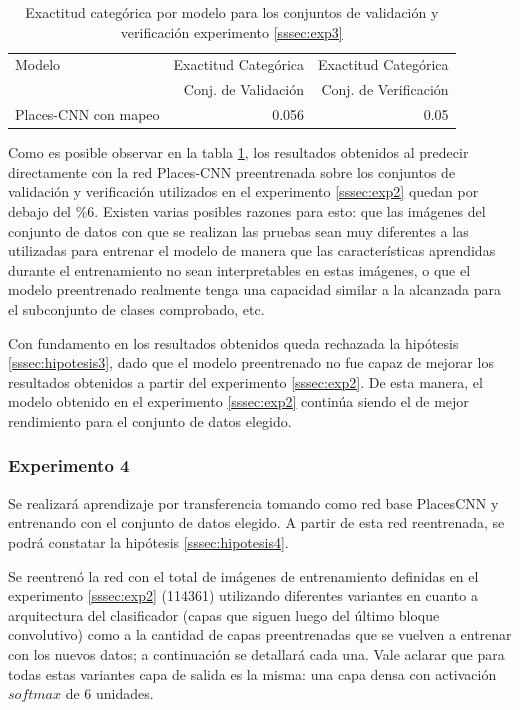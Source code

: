 \begin{table}[h!]
	\centering
	\begin{tabular}{| l | r | r |}
		\toprule
		Modelo & Exactitud Categórica &  Exactitud Categórica \\
		{} & Conj. de Validación &  Conj. de Verificación \\
		\midrule
		Places-CNN con mapeo & 0.056 & 0.05 \\
		\bottomrule
	\end{tabular}
	\caption{Exactitud categórica por modelo para los conjuntos de validación y verificación experimento \ref{sssec:exp3}}
	\label{exp3:results}
\end{table}

Como es posible observar en la tabla \ref{exp3:results}, los resultados obtenidos al predecir directamente con la red Places-CNN preentrenada sobre los conjuntos de validación y verificación utilizados en el experimento \ref{sssec:exp2} quedan por debajo del \%6. Existen varias posibles razones para esto: que las imágenes del conjunto de datos con que se realizan las pruebas sean muy diferentes a las utilizadas para entrenar el modelo de manera que las características aprendidas durante el entrenamiento no sean interpretables en estas imágenes, o que el modelo preentrenado realmente tenga una capacidad similar a la alcanzada para el subconjunto de clases comprobado, etc.

Con fundamento en los resultados obtenidos queda rechazada la hipótesis \ref{sssec:hipotesis3}, dado que el modelo preentrenado no fue capaz de mejorar los resultados obtenidos a partir del experimento \ref{sssec:exp2}. De esta manera, el modelo obtenido en el experimento \ref{sssec:exp2} continúa siendo el de mejor rendimiento para el conjunto de datos elegido.

\subsubsection{Experimento 4} \label{sssec:exp4}
Se realizará aprendizaje por transferencia tomando como red base PlacesCNN y entrenando con el conjunto de datos elegido. A partir de esta red reentrenada, se podrá constatar la hipótesis \ref{sssec:hipotesis4}.

Se reentrenó la red con el total de imágenes de entrenamiento definidas en el experimento \ref{sssec:exp2} (114361) utilizando diferentes variantes en cuanto a arquitectura del clasificador (capas que siguen luego del último bloque convolutivo) como a la cantidad de capas preentrenadas que se vuelven a entrenar con los nuevos datos; a continuación se detallará cada una. Vale aclarar que para todas estas variantes capa de salida es la misma: una capa densa con activación \(softmax\) de 6 unidades.

